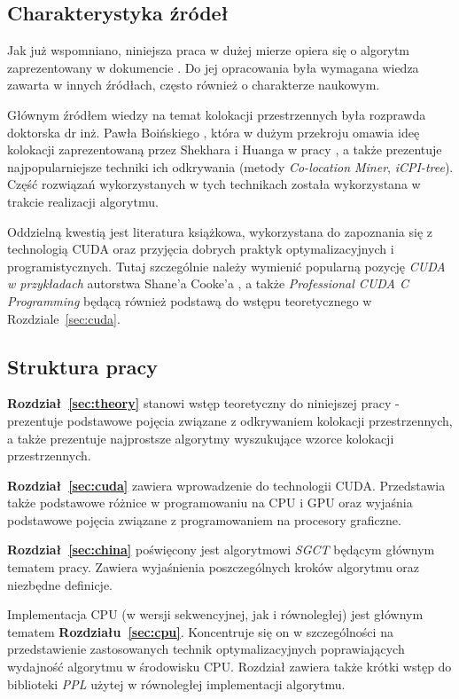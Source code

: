 \documentclass[12pt]{article}
\newcounter{algorytm}
\begin{document}
\subsection{Charakterystyka źródeł}

Jak już wspomniano, niniejsza praca w dużej mierze opiera się o algorytm zaprezentowany w dokumencie \cite{chinczyki}. Do jej opracowania była wymagana wiedza zawarta w innych źródłach, często również o charakterze naukowym.

Głównym źródłem wiedzy na temat kolokacji przestrzennych była rozprawda doktorska dr inż. Pawła Boińskiego \cite{boinski}, która w dużym przekroju omawia ideę kolokacji zaprezentowaną przez Shekhara i Huanga w pracy \cite{huang}, a także prezentuje najpopularniejsze techniki ich odkrywania (metody \textit{Co-location Miner}, \textit{iCPI-tree}). Część rozwiązań wykorzystanych w tych technikach została wykorzystana w trakcie realizacji algorytmu.

Oddzielną kwestią jest literatura książkowa, wykorzystana do zapoznania się z technologią CUDA oraz przyjęcia dobrych praktyk optymalizacyjnych i programistycznych. Tutaj szczególnie należy wymienić popularną pozycję \textit{CUDA w przykładach} autorstwa Shane'a Cooke'a \cite{cuda_by_examples}, a także \textit{Professional CUDA C Programming} \cite{professional_cuda} będącą również podstawą do wstępu teoretycznego w Rozdziale~\ref{sec:cuda}.

\subsection{Struktura pracy}

\textbf{Rozdział~\ref{sec:theory}} stanowi wstęp teoretyczny do niniejszej pracy - prezentuje podstawowe pojęcia związane z odkrywaniem kolokacji przestrzennych, a także prezentuje najprostsze algorytmy wyszukujące wzorce kolokacji przestrzennych.

\textbf{Rozdział~\ref{sec:cuda}} zawiera wprowadzenie do technologii CUDA. Przedstawia także podstawowe różnice w programowaniu na CPU i GPU oraz wyjaśnia podstawowe pojęcia związane z programowaniem na procesory graficzne.

\textbf{Rozdział~\ref{sec:china}} poświęcony jest algorytmowi \textit{SGCT} będącym głównym tematem pracy. Zawiera wyjaśnienia poszczególnych kroków algorytmu oraz niezbędne definicje.

Implementacja CPU (w wersji sekwencyjnej, jak i równoległej) jest głównym tematem \textbf{Rozdziału~\ref{sec:cpu}}. Koncentruje się on w szczególności na przedstawienie zastosowanych technik optymalizacyjnych poprawiających wydajność algorytmu w środowisku CPU. Rozdział zawiera także krótki wstęp do biblioteki \textit{PPL} użytej w równoległej implementacji algorytmu.
\end{document}
